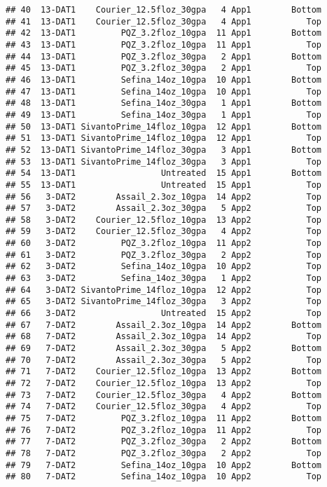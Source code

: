 \documentclass[
]{article}
\begin{document}
\begin{verbatim}
## 40  13-DAT1    Courier_12.5floz_30gpa   4 App1        Bottom
## 41  13-DAT1    Courier_12.5floz_30gpa   4 App1           Top
## 42  13-DAT1         PQZ_3.2floz_10gpa  11 App1        Bottom
## 43  13-DAT1         PQZ_3.2floz_10gpa  11 App1           Top
## 44  13-DAT1         PQZ_3.2floz_30gpa   2 App1        Bottom
## 45  13-DAT1         PQZ_3.2floz_30gpa   2 App1           Top
## 46  13-DAT1         Sefina_14oz_10gpa  10 App1        Bottom
## 47  13-DAT1         Sefina_14oz_10gpa  10 App1           Top
## 48  13-DAT1         Sefina_14oz_30gpa   1 App1        Bottom
## 49  13-DAT1         Sefina_14oz_30gpa   1 App1           Top
## 50  13-DAT1 SivantoPrime_14floz_10gpa  12 App1        Bottom
## 51  13-DAT1 SivantoPrime_14floz_10gpa  12 App1           Top
## 52  13-DAT1 SivantoPrime_14floz_30gpa   3 App1        Bottom
## 53  13-DAT1 SivantoPrime_14floz_30gpa   3 App1           Top
## 54  13-DAT1                 Untreated  15 App1        Bottom
## 55  13-DAT1                 Untreated  15 App1           Top
## 56   3-DAT2        Assail_2.3oz_10gpa  14 App2           Top
## 57   3-DAT2        Assail_2.3oz_30gpa   5 App2           Top
## 58   3-DAT2    Courier_12.5floz_10gpa  13 App2           Top
## 59   3-DAT2    Courier_12.5floz_30gpa   4 App2           Top
## 60   3-DAT2         PQZ_3.2floz_10gpa  11 App2           Top
## 61   3-DAT2         PQZ_3.2floz_30gpa   2 App2           Top
## 62   3-DAT2         Sefina_14oz_10gpa  10 App2           Top
## 63   3-DAT2         Sefina_14oz_30gpa   1 App2           Top
## 64   3-DAT2 SivantoPrime_14floz_10gpa  12 App2           Top
## 65   3-DAT2 SivantoPrime_14floz_30gpa   3 App2           Top
## 66   3-DAT2                 Untreated  15 App2           Top
## 67   7-DAT2        Assail_2.3oz_10gpa  14 App2        Bottom
## 68   7-DAT2        Assail_2.3oz_10gpa  14 App2           Top
## 69   7-DAT2        Assail_2.3oz_30gpa   5 App2        Bottom
## 70   7-DAT2        Assail_2.3oz_30gpa   5 App2           Top
## 71   7-DAT2    Courier_12.5floz_10gpa  13 App2        Bottom
## 72   7-DAT2    Courier_12.5floz_10gpa  13 App2           Top
## 73   7-DAT2    Courier_12.5floz_30gpa   4 App2        Bottom
## 74   7-DAT2    Courier_12.5floz_30gpa   4 App2           Top
## 75   7-DAT2         PQZ_3.2floz_10gpa  11 App2        Bottom
## 76   7-DAT2         PQZ_3.2floz_10gpa  11 App2           Top
## 77   7-DAT2         PQZ_3.2floz_30gpa   2 App2        Bottom
## 78   7-DAT2         PQZ_3.2floz_30gpa   2 App2           Top
## 79   7-DAT2         Sefina_14oz_10gpa  10 App2        Bottom
## 80   7-DAT2         Sefina_14oz_10gpa  10 App2           Top

\end{verbatim}
\end{document}
